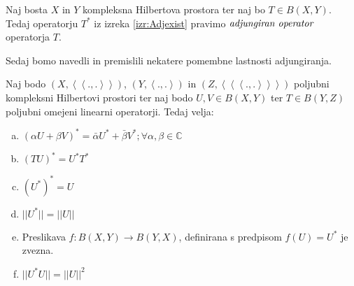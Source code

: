 \documentclass[mat2]{matdelo}
\newcommand{\C}{\mathbb{C}}
\newcommand{\abs}[1]{\ensuremath{\lvert #1 \rvert}}
\newcommand{\norm}[1]{\abs{\abs{#1}}}
\newcommand{\pojem}[1]{\ensuremath{\emph{#1}}}
\newcommand{\Sp}[2]{\ensuremath{\left<#1, #2\right>}}
\newcommand{\Spp}[2]{\ensuremath{\left<\left<#1, #2\right>\right>}}
\newcommand{\Sppp}[2]{\ensuremath{\left<\left<\left<#1, #2\right>\right>\right>}}
\newcommand{\map}[3]{\ensuremath{{#1}:{#2}\rightarrow{#3}}}
\begin{document}
			\begin{definicija}
				\label{def:adjop}
				Naj bosta $X$ in $Y$ kompleksna Hilbertova prostora ter naj bo $T\in B(X, Y)$. Tedaj operatorju $T^*$ iz izreka \ref{izr:Adjexist} pravimo \pojem{adjungiran operator} operatorja $T$.
			\end{definicija}
			Sedaj bomo navedli in premislili nekatere pomembne lastnosti adjungiranja.
			
			\begin{izrek}
				\label{izr:adjlast}
				Naj bodo $(X, \Spp{.}{.})$, $(Y, \Sp{.}{.})$ in $(Z, \Sppp{.}{.})$ poljubni kompleksni Hilbertovi prostori ter naj bodo $U, V \in B(X, Y)$ ter $T \in B(Y, Z)$ poljubni omejeni linearni operatorji. Tedaj velja: \begin{enumerate}[a)]
					\item $(\alpha U + \beta V)^* = \bar{\alpha}U^* + \bar{\beta}V^*; \forall \alpha, \beta \in \C$
					\item $(TU)^* = U^*T^*$
					\item $(U^*)^* = U$
					\item $\norm{U^*} = \norm{U}$
					\item Preslikava $\map{f}{B(X, Y)}{B(Y, X)}$, definirana s predpisom $f(U) = U^*$ je zvezna.
					\item $\norm{U^*U} = \norm{U}^2$
				\end{enumerate}
			\end{izrek}
			
\end{document}
